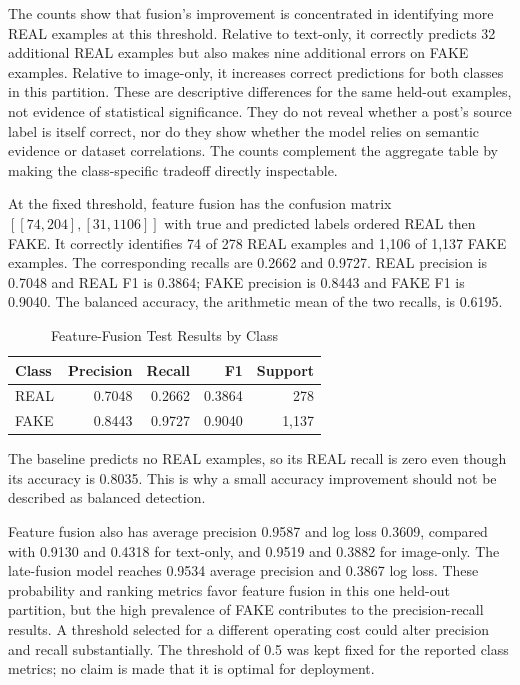 \documentclass[conference]{IEEEtran}
\begin{document}
The counts show that fusion's improvement is concentrated in identifying more REAL examples at this threshold. Relative to text-only, it correctly predicts 32 additional REAL examples but also makes nine additional errors on FAKE examples. Relative to image-only, it increases correct predictions for both classes in this partition. These are descriptive differences for the same held-out examples, not evidence of statistical significance. They do not reveal whether a post's source label is itself correct, nor do they show whether the model relies on semantic evidence or dataset correlations. The counts complement the aggregate table by making the class-specific tradeoff directly inspectable.

At the fixed threshold, feature fusion has the confusion matrix $[[74,204],[31,1106]]$ with true and predicted labels ordered REAL then FAKE. It correctly identifies 74 of 278 REAL examples and 1,106 of 1,137 FAKE examples. The corresponding recalls are 0.2662 and 0.9727. REAL precision is 0.7048 and REAL F1 is 0.3864; FAKE precision is 0.8443 and FAKE F1 is 0.9040. The balanced accuracy, the arithmetic mean of the two recalls, is 0.6195.
\begin{table}[t]
\caption{Feature-Fusion Test Results by Class}\label{tab:class}\centering\footnotesize
\begin{tabular}{lrrrr}
\hline Class & Precision & Recall & F1 & Support\\\hline
REAL & 0.7048 & 0.2662 & 0.3864 & 278\\
FAKE & 0.8443 & 0.9727 & 0.9040 & 1,137\\\hline
\end{tabular}
\end{table}
 The baseline predicts no REAL examples, so its REAL recall is zero even though its accuracy is 0.8035. This is why a small accuracy improvement should not be described as balanced detection.

Feature fusion also has average precision 0.9587 and log loss 0.3609, compared with 0.9130 and 0.4318 for text-only, and 0.9519 and 0.3882 for image-only. The late-fusion model reaches 0.9534 average precision and 0.3867 log loss. These probability and ranking metrics favor feature fusion in this one held-out partition, but the high prevalence of FAKE contributes to the precision-recall results. A threshold selected for a different operating cost could alter precision and recall substantially. The threshold of 0.5 was kept fixed for the reported class metrics; no claim is made that it is optimal for deployment.
\end{document}

